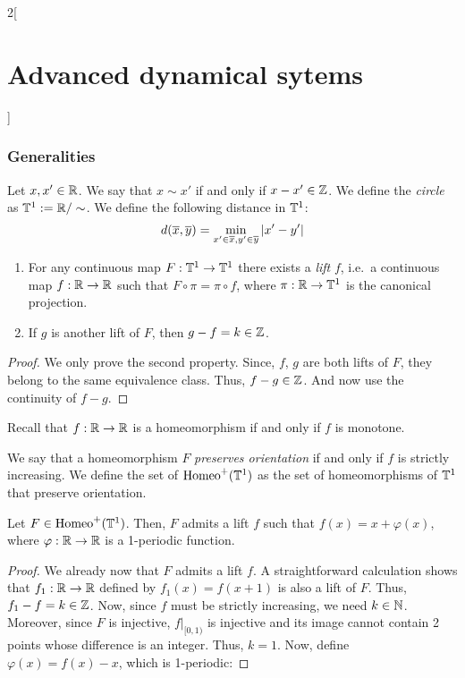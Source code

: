 \documentclass[../../../main_math.tex]{subfiles}
\begin{document}
\begin{multicols}{2}[\section{Advanced dynamical sytems}]
  \subsubsection{Generalities}
  \begin{definition}
    Let $x,x'\in\mathbb{R}$. We say that $x\sim x'$ if and only if $x-x'\in\mathbb{Z}$. We define the \emph{circle} as $\TT^1:=\quot{\RR}{\sim}$. We define the following distance in $\mathbb{T}^1$:
    $$
      d(\overline{x},\overline{y})=\min_{x'\in\overline{x},y'\in\overline{y}}\abs{x'-y'}
    $$
  \end{definition}
  \begin{proposition}\hfill
    \begin{enumerate}
      \item For any continuous map $F:\mathbb{T}^1\to \mathbb{T}^1$ there exists a \emph{lift} $f$, i.e.\ a continuous map $f:\mathbb{R}\to \mathbb{R}$ such that $F\circ \pi=\pi\circ f$, where $\pi:\mathbb{R}\to\mathbb{T}^1$ is the canonical projection.
      \item If $g$ is another lift of $F$, then $g-f=k\in\mathbb{Z}$.
    \end{enumerate}
  \end{proposition}
  \begin{proof}
    We only prove the second property. Since, $f$, $g$ are both lifts of $F$, they belong to the same equivalence class. Thus, $f-g\in\mathbb{Z}$. And now use the continuity of $f-g$.
  \end{proof}
  \begin{remark}
    Recall that $f:\mathbb{R}\to\mathbb{R}$ is a homeomorphism if and only if $f$ is monotone.
  \end{remark}
  \begin{definition}
    We say that a homeomorphism $F$ \emph{preserves orientation} if and only if $f$ is strictly increasing. We define the set of $\mathrm{Homeo}^+(\mathbb{T}^1)$ as the set of homeomorphisms of $\mathbb{T}^1$ that preserve orientation.
  \end{definition}
  \begin{proposition}
    Let $F\in\mathrm{Homeo}^+(\mathbb{T}^1)$. Then, $F$ admits a lift $f$ such that $f(x)=x+\varphi(x)$, where $\varphi:\mathbb{R}\to\mathbb{R}$ is a 1-periodic function.
  \end{proposition}
  \begin{proof}
    We already now that $F$ admits a lift $f$. A straightforward calculation shows that $f_1:\mathbb{R}\to\mathbb{R}$ defined by $f_1(x)=f(x+1)$ is also a lift of $F$. Thus, $f_1-f=k\in \mathbb{Z}$. Now, since $f$ must be strictly increasing, we need $k\in \mathbb{N}$. Moreover, since $F$ is injective, $f|_{[0,1)}$ is injective and its image cannot contain 2 points whose difference is an integer. Thus, $k=1$. Now, define $\varphi(x)=f(x)-x$, which is 1-periodic:

\end{proof}
\end{multicols}
\end{document}
